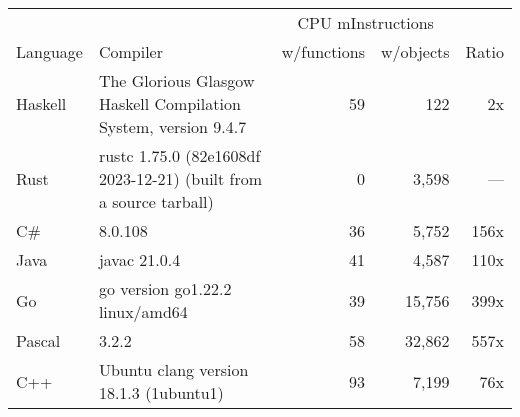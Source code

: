 \documentclass{article}
\begin{document}
      \begin{tabularx}{\linewidth}{lXrrr}
      \toprule
        & & \multicolumn{2}{c}{CPU mInstructions} & \\
        Language & Compiler & w/functions & w/objects & Ratio \\
      \midrule
    Haskell & The Glorious Glasgow Haskell Compilation System, version 9.4.7 & 59 & 122 & 2x \\
Rust & rustc 1.75.0 (82e1608df 2023-12-21) (built from a source tarball) & 0 & 3,598 & --- \\
C\# & 8.0.108 & 36 & 5,752 & 156x \\
Java & javac 21.0.4 & 41 & 4,587 & 110x \\
Go & go version go1.22.2 linux/amd64 & 39 & 15,756 & 399x \\
Pascal & 3.2.2 & 58 & 32,862 & 557x \\
C++ & Ubuntu clang version 18.1.3 (1ubuntu1) & 93 & 7,199 & 76x \\

      \bottomrule
      \end{tabularx}
      
\end{document}
